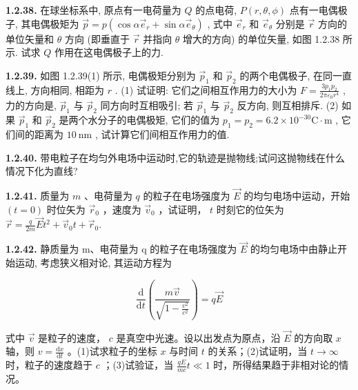 \vfill

\textbf{1.2.38.} 在球坐标系中, 原点有一电荷量为 $Q$ 的点电荷, $P(r, \theta, \phi)$ 点有一电偶极子, 其电偶极矩为 $\vec{p} = p(\cos \alpha \vec{e}_r + \sin \alpha \vec{e}_\theta)$ , 式中 $\vec{e}_r$ 和 $\vec{e}_\theta$ 分别是 $\vec{r}$ 方向的单位矢量和 $\theta$ 方向 (即垂直于 $\vec{r}$ 并指向 $\theta$ 增大的方向) 的单位矢量, 如图 1.2.38 所示. 试求 $Q$ 作用在这电偶极子上的力.



\begin{center}
\end{center}


\vfill

\newpage
\textbf{1.2.39.} 如图 1.2.39(1) 所示, 电偶极矩分别为 $\vec{p}_1$ 和 $\vec{p}_2$ 的两个电偶极子, 在同一直线上, 方向相同, 相距为 $r$ . (1) 试证明: 它们之间相互作用力的大小为 $\displaystyle F = \frac{3p_1p_2}{2\pi\varepsilon_0r^4}$ , 力的方向是, $\vec{p}_1$ 与 $\vec{p}_2$ 同方向时互相吸引; 若 $\vec{p}_1$ 与 $\vec{p}_2$ 反方向, 则互相排斥. (2) 如果 $\vec{p}_1$ 和 $\vec{p}_2$ 是两个水分子的电偶极矩, 它们的值为 $p_1 = p_2 = 6.2 \times 10^{-30} \mathrm{C} \cdot \mathrm{m}$ , 它们间的距离为 $10 \mathrm{~nm}$ , 试计算它们间相互作用力的值.



\begin{center}
\end{center}


\vfill

\textbf{1.2.40.} 带电粒子在均匀外电场中运动时,它的轨迹是抛物线;试问这抛物线在什么情况下化为直线?

\vfill

\newpage
\textbf{1.2.41.} 质量为 $m$ 、电荷量为 $q$ 的粒子在电场强度为 $\vec{E}$ 的均匀电场中运动，开始 $(t = 0)$ 时位矢为 $\vec{r}_0$ ，速度为 $\vec{v}_0$ ，试证明， $t$ 时刻它的位矢为 $\displaystyle \vec{r} = \frac{q}{2m} \vec{E}t^2 +\vec{v}_0t + \vec{r}_0.$

\vfill

\textbf{1.2.42.} 静质量为 m、电荷量为 q 的粒子在电场强度为 $\vec{E}$ 的均匀电场中由静止开始运动, 考虑狭义相对论, 其运动方程为

$$
\frac {\mathrm{d}}{\mathrm{d} t} \left(\frac {m \vec{v}}{\sqrt {1 - \frac {v ^ {2}}{c ^ {2}}}}\right) = q \vec{E}
$$

式中 $\vec{v}$ 是粒子的速度， $c$ 是真空中光速。设以出发点为原点，沿 $\vec{E}$ 的方向取 $x$ 轴，则 $\displaystyle v = \frac{\mathrm{d}x}{\mathrm{d}t}$ 。(1)试求粒子的坐标 $x$ 与时间 $t$ 的关系；(2)试证明，当 $t \to \infty$ 时，粒子的速度趋于 $c$ ；(3)试验证，当 $\displaystyle \frac{qE}{mc} t \ll 1$ 时，所得结果趋于非相对论的情况。


